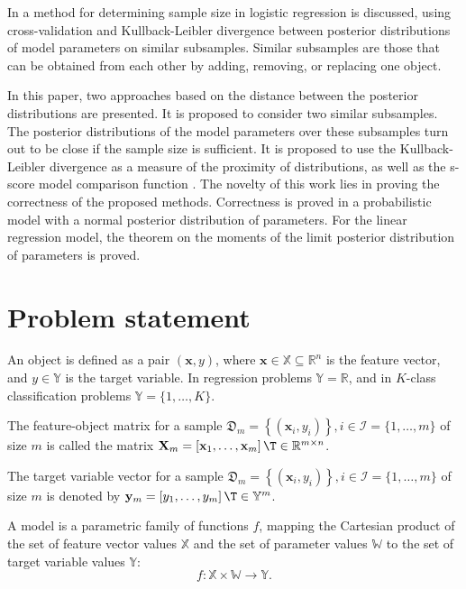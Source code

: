 \documentclass[runningheads]{llncs}
\begin{document}
In \cite{MOTRENKO2014743} a method for determining sample size in logistic regression is discussed, using cross-validation and Kullback-Leibler divergence between posterior distributions of model parameters on similar subsamples. Similar subsamples are those that can be obtained from each other by adding, removing, or replacing one object.

In this paper, two approaches based on the distance between the posterior distributions are presented. It is proposed to consider two similar subsamples. The posterior distributions of the model parameters over these subsamples turn out to be close if the sample size is sufficient. It is proposed to use the Kullback-Leibler divergence \cite{MOTRENKO2014743} as a measure of the proximity of distributions, as well as the s-score model comparison function \cite{Aduenko2017}. The novelty of this work lies in proving the correctness of the proposed methods. Correctness is proved in a probabilistic model with a normal posterior distribution of parameters. For the linear regression model, the theorem on the moments of the limit posterior distribution of parameters is proved.

\section{Problem statement}
An object is defined as a pair $(\mathbf{x}, y)$, where $\mathbf{x} \in \mathbb{X} \subseteq \mathbb{R}^n$ is the feature vector, and $y \in \mathbb{Y}$ is the target variable. In regression problems $\mathbb{Y} = \mathbb{R}$, and in $K$-class classification problems $\mathbb{Y} = \{1, \ldots, K\}$.

The feature-object matrix for a sample $\mathfrak{D}_m = \left\{ (\mathbf{x}_i, y_i) \right\}, i \in \mathcal{I} = \{ 1, \ldots, m \}$ of size $m$ is called the matrix $\mathbf{X}_m = \left[ \mathbf{x}_1, \ldots, \mathbf{x}_m \right]\T \in \mathbb{R}^{m \times n}$.

The target variable vector for a sample $\mathfrak{D}_m = \left\{ (\mathbf{x}_i, y_i) \right\}, i \in \mathcal{I} = \{ 1, \ldots, m \}$ of size $m$ is denoted by $\mathbf{y}_m = \left[ y_1, \ldots, y_m \right]\T \in \mathbb{Y}^m$.

A model is a parametric family of functions $f$, mapping the Cartesian product of the set of feature vector values $\mathbb{X}$ and the set of parameter values $\mathbb{W}$ to the set of target variable values $\mathbb{Y}$: 
\[ f: \mathbb{X} \times \mathbb{W} \to \mathbb{Y}. \]
\end{document}
